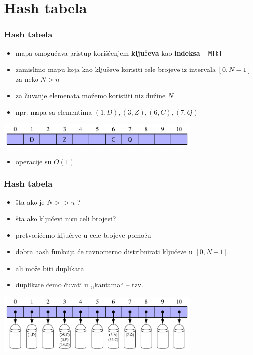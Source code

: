 \documentclass[compress,aspectratio=169]{beamer}
\begin{document}
\section[Hash tabela]{Hash tabela}
\begin{frame}[fragile]
  \frametitle{Hash tabela}
  \begin{itemize}
    \item mapa omogućava pristup korišćenjem \textbf{ključeva} kao \textbf{indeksa} -- \texttt{M[k]}  
    \item zamislimo mapu koja kao ključeve korisiti cele brojeve iz intervala $[0, N-1]$ za neko $N > n$
    \item za čuvanje elemenata možemo koristiti  niz dužine $N$
    \item npr. mapa sa elementima $(1,D), (3,Z), (6,C), (7,Q)$
  \end{itemize}
  \begin{center}
    \includegraphics[width=10cm]{asp-10-pic04.pdf}
  \end{center}
  \begin{itemize}
    \item operacije su $O(1)$  
  \end{itemize}
\end{frame}

\begin{frame}[fragile]
  \frametitle{Hash tabela}
  \begin{itemize}
    \item šta ako je $N >> n$ ?  
    \item šta ako ključevi nisu celi brojevi?
    \item pretvorićemo ključeve u cele brojeve pomoću 
    \item dobra hash funkcija će ravnomerno distribuirati ključeve u $[0,N-1]$
    \item ali može biti duplikata
    \item duplikate ćemo čuvati u ,,kantama`` -- tzv. 
  \end{itemize}
  \begin{center}
    \includegraphics[width=10cm]{asp-10-pic05.pdf}
  \end{center}
\end{frame}
\end{document}
